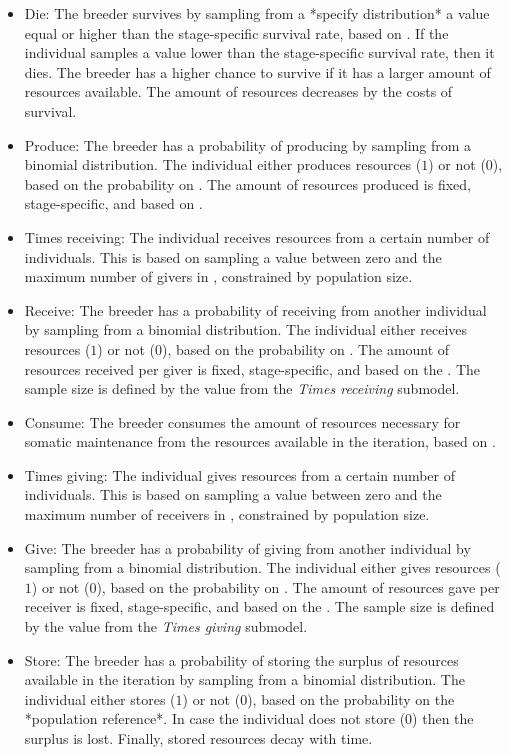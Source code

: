 \documentclass{article}
\begin{document}
\begin{itemize}
    \item Die: The breeder survives by sampling from a *specify distribution* a value equal or higher than the stage-specific survival rate, based on \cite{gurven2007longevity}. If the individual samples a value lower than the stage-specific survival rate, then it dies. The breeder has a higher chance to survive if it has a larger amount of resources available. The amount of resources decreases by the costs of survival.
    \item Produce: The breeder has a probability of producing by sampling from a binomial distribution. The individual either produces resources ($1$) or not ($0$), based on the probability on \cite{koster2020life}. The amount of resources produced is fixed, stage-specific, and based on \cite{koster2020life}.
    \item Times receiving: The individual receives resources from a certain number of individuals. This is based on sampling a value between zero and the maximum number of givers in \cite{gurven2004give}, constrained by population size.
    \item Receive: The breeder has a probability of receiving from another individual by sampling from a binomial distribution. The individual either receives resources ($1$) or not ($0$), based on the probability on \cite{gurven2004give}. The amount of resources received per giver is fixed, stage-specific, and based on the \cite{gurven2004give}. The sample size is defined by the value from the \emph{Times receiving} submodel. 
    \item Consume: The breeder consumes the amount of resources necessary for somatic maintenance from the resources available in the iteration, based on \cite{kaplan2000theory}.
    \item Times giving: The individual gives resources from a certain number of individuals. This is based on sampling a value between zero and the maximum number of receivers in \cite{gurven2004give}, constrained by population size.
    \item Give: The breeder has a probability of giving from another individual by sampling from a binomial distribution. The individual either gives resources ($1$) or not ($0$), based on the probability on \cite{gurven2004give}. The amount of resources gave per receiver is fixed, stage-specific, and based on the \cite{gurven2004give}. The sample size is defined by the value from the \emph{Times giving} submodel. 
    \item Store: The breeder has a probability of storing the surplus of resources available in the iteration by sampling from a binomial distribution. The individual either stores ($1$) or not ($0$), based on the probability on the *population reference*. In case the individual does not store ($0$) then the surplus is lost. Finally, stored resources decay with time.

\end{itemize}
\end{document}
